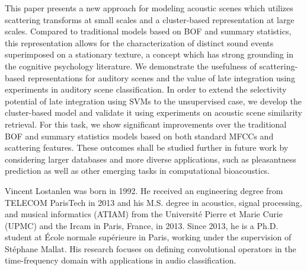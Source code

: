 \documentclass[journal]{IEEEtran}
\begin{document}
This paper presents a new approach for modeling acoustic scenes which utilizes scattering transforms at small scales and a cluster-based representation at large scales. Compared to traditional models based on BOF and summary statistics, this representation allows for the characterization of distinct sound events superimposed on a stationary texture, a concept which has strong grounding in the cognitive psychology literature. We demonstrate the usefulness of scattering-based representations for auditory scenes and the value of late integration using experiments in auditory scene classification. In order to extend the selectivity potential of late integration using SVMs to the unsupervised case, we develop the cluster-based model and validate it using experiments on acoustic scene similarity retrieval. For this task, we show significant improvements over the traditional BOF and summary statistics models based on both standard MFCCs and scattering features.
These outcomes shall be studied further in future work by considering larger databases and more diverse applications, such as pleasantness prediction \cite{lafaySoundscapePilot} as well as other emerging tasks in computational bioacoustics.

%
%
\printbibliography

\begin{IEEEbiography}{Vincent Lostanlen} was born in 1992. He received an engineering degree from TELECOM ParisTech in 2013 and his M.S. degree in acoustics, signal processing, and musical informatics (ATIAM) from the Universit\'{e} Pierre et Marie Curie (UPMC) and the Ircam in Paris, France, in 2013. Since 2013, he is a Ph.D. student at \'{E}cole normale sup\'{e}rieure in Paris, working under the supervision of St\'{e}phane Mallat. His research focuses on defining convolutional operators in the time-frequency domain with applications in audio classification.
\end{IEEEbiography}
\end{document}
